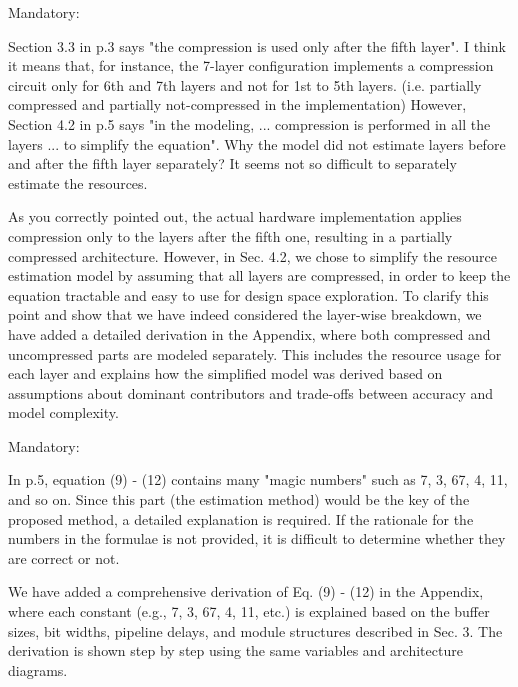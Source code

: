 \documentclass[a4j]{jsarticle}
\begin{document}
\vspace{0.3cm}
\begin{screen}
Mandatory:

Section 3.3 in p.3 says "the compression is used only after the fifth layer".
I think it means that, for instance, the 7-layer configuration implements a compression circuit only for 6th and 7th layers and not for 1st to 5th layers. (i.e. partially compressed and partially not-compressed in the implementation)
However, Section 4.2 in p.5 says "in the modeling, ... compression is performed in all the layers ... to simplify the equation".
Why the model did not estimate layers before and after the fifth layer separately? It seems not so difficult to separately estimate the resources.
\end{screen}
As you correctly pointed out, the actual hardware implementation applies compression 
only to the layers after the fifth one, resulting in a partially compressed architecture. 
However, in Sec. 4.2, we chose to simplify the resource estimation model by assuming that all layers 
are compressed, in order to keep the equation tractable and easy to use for design space exploration.
To clarify this point and show that we have indeed considered the layer-wise breakdown, 
we have added a detailed derivation in the Appendix, where both compressed and uncompressed parts 
are modeled separately. This includes the resource usage for each layer and explains how the simplified 
model was derived based on assumptions about dominant contributors and trade-offs between accuracy and model complexity.



\vspace{0.3cm}
\begin{screen}
Mandatory:

In p.5, equation (9) - (12) contains many "magic numbers" such as 7, 3, 67, 4, 11, and so on.
Since this part (the estimation method) would be the key of the proposed method, a detailed explanation is required.
If the rationale for the numbers in the formulae is not provided, it is difficult to determine whether they are correct or not.
\end{screen}
We have added a comprehensive derivation of Eq. (9) - (12) in the Appendix, 
where each constant (e.g., 7, 3, 67, 4, 11, etc.) is explained based on the buffer sizes, 
bit widths, pipeline delays, and module structures described in Sec. 3. 
The derivation is shown step by step using the same variables and architecture diagrams.
\end{document}
